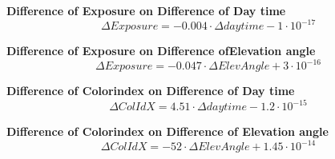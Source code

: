 \documentclass  [
  paper    = a4,
  BCOR     = 10mm,
  twoside,
  fontsize = 12pt,
  fleqn,
  toc      = bibnumbered,
  toc      = listofnumbered,
  numbers  = noendperiod,
  headings = normal,
  listof   = leveldown,
  version  = 3.03
]                                       {scrreprt}
\begin{document}
				\textbf{Difference of  Exposure on  Difference of Day time}
		\begin{equation}
		\Delta Exposure  =-0.004\cdot \Delta daytime -1\cdot 10^{-17}
		\end{equation}
		
						\textbf{Difference of  Exposure  on  Difference ofElevation angle}
		\begin{equation}
		\Delta Exposure  =-0.047\cdot \Delta  ElevAngle +3\cdot 10^{-16}
		\end{equation}


		\textbf{Difference of  Colorindex  on  Difference of Day time}
		\begin{equation}
		\Delta ColIdX  =4.51\cdot \Delta daytime-1.2\cdot 10^{-15}
		\end{equation}
		
		\textbf{Difference of  Colorindex  on  Difference of Elevation angle}
		\begin{equation}
		\Delta ColIdX  =-52\cdot \Delta ElevAngle+ 1.45\cdot 10^{-14}
		\end{equation}
		
\end{document}
